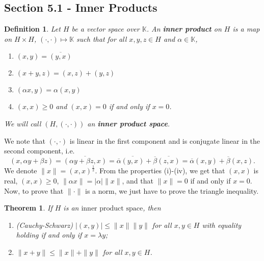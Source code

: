 \documentclass[12pt]{article}
\newtheorem{theorem}{Theorem}
\newtheorem{definition}{Definition}
\def\K{\mathbb{K}}
\newcommand{\ov}{\overline}
\newcommand{\inner}{(\cdot, \cdot)}
\newcommand{\ips}{\text{inner product space}}
\begin{document}
\subsection*{Section 5.1 - Inner Products}
\begin{definition}
Let $H$ be a vector space over $\K$. An \textbf{inner product} on $H$ is a map on $H \times H$, $(\cdot, \cdot) \mapsto \K$ such that for all $x, y, z \in H$ and  $\alpha \in \K$,
\begin{enumerate}[topsep=-15pt, itemsep=0pt]
\item[(i)] $(x, y) = \ov{(y, x)}$
\item[(ii)] $(x + y, z) = (x, z) + (y, z)$
\item[(iii)] $(\alpha x, y) = \alpha (x, y)$
\item[(iv)] $(x, x) \geq 0$ and $(x, x) = 0$ if and only if $x = 0$. 
\end{enumerate}
We will call $(H, \inner)$ an \textbf{inner product space}.
\end{definition}
We note that $\inner$ is linear in the first component and  is conjugate linear in the second component, i.e.
\[ (x, \alpha y +\beta z) = \ov{(\alpha y + \beta z, x)} = \ov{\alpha} \ov{(y, x)} + \ov{\beta} \ov{(z, x)} = \ov{\alpha} (x, y) + \ov{\beta} (x, z). \]
We denote $\| x \| = (x, x)^{\frac{1}{2}}$. From the properties (i)-(iv), we get that $(x, x)$ is real, $(x, x) \geq 0$, $\| \alpha x \| = | \alpha | \| x \|$, and that $\| x \| = 0$ if and only if $x = 0$. Now, to prove that $\| \cdot \|$ is a norm, we just have to prove the triangle inequality. 
\begin{theorem}
If $H$ is an $\ips$, then 
\begin{enumerate}[topsep=-15pt, itemsep=0pt]
\item (Cauchy-Schwarz) $|(x, y)| \leq \| x \|  \| y \|$ for all $x, y \in H$ with equality holding if and only if $x = \lambda y$;
\item $\| x + y \| \leq \| x \| + \| y \|$ for all $x, y \in H$. 
\end{enumerate}
\end{theorem}
\vspace{-25pt}
\end{document}
